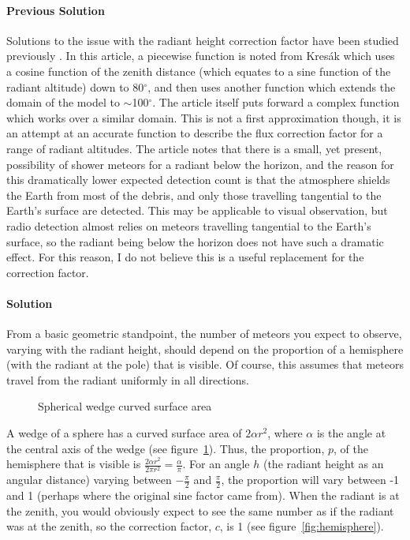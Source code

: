 \paragraph{Previous Solution} Solutions to the issue with the radiant height
correction factor have been studied previously \cite{hr_correction}. In this
article, a piecewise function is noted from Kres\'{a}k \cite{kresak} which uses
a cosine function of the zenith distance (which equates to a sine function of
the radiant altitude) down to 80$^{\circ}$, and then uses another function
which extends the domain of the model to ${\sim}$100$^{\circ}$. The article
itself puts forward a complex function which works over a similar domain. This
is not a first approximation though, it is an attempt at an accurate function
to describe the flux correction factor for a range of radiant altitudes. The
article notes that there is a small, yet present, possibility of shower meteors
for a radiant below the horizon, and the reason for this dramatically lower
expected detection count is that the atmosphere shields the Earth from most of
the debris, and only those travelling tangential to the Earth's surface are
detected. This may be applicable to visual observation, but radio detection
almost relies on meteors travelling tangential to the Earth's surface, so the
radiant being below the horizon does not have such a dramatic effect. For this
reason, I do not believe this is a useful replacement for the correction
factor.

\paragraph{Solution\\} From a basic geometric standpoint, the number of meteors
you expect to observe, varying with the radiant height, should depend on the
proportion of a hemisphere (with the radiant at the pole) that is visible. Of
course, this assumes that meteors travel from the radiant uniformly in all
directions. 

\begin{figure}[h!] 
	\centering 
	 
	\caption{Spherical wedge curved surface area
	\label{fig:wedge}} 
\end{figure}

A wedge of a sphere has a curved surface area of $2{\alpha}r^2$, where $\alpha$
is the angle at the central axis of the wedge (see figure~\ref{fig:wedge}).
Thus, the proportion, $p$, of the hemisphere that is visible is
$\frac{2{\alpha}r^2}{2{\pi}r^2} = \frac{\alpha}{\pi}$. For an angle $h$ (the
radiant height as an angular distance) varying between $-\frac{\pi}{2}$ and
$\frac{\pi}{2}$, the proportion will vary between -1 and 1 (perhaps where the
original sine factor came from). When the radiant is at the zenith, you would
obviously expect to see the same number as if the radiant was at the zenith, so
the correction factor, $c$, is 1 (see figure~\ref{fig:hemisphere}). 

